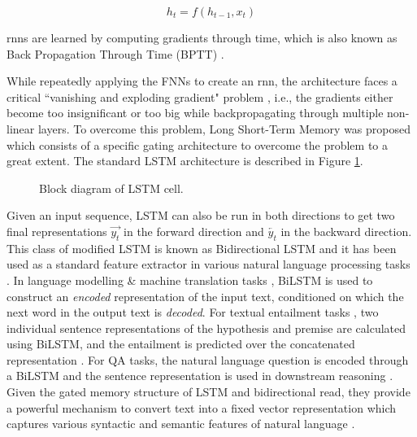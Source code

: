 \documentclass[letterpaper, 12pt]{report}
\begin{document}
\begin{equation}
    h_t = f(h_{t-1}, x_t)
\end{equation}{}

\acrshort{rnn}s are learned by computing gradients through time, which is also known as Back Propagation Through Time (BPTT) \citep{rumelhart1986learning}.

While repeatedly applying the FNNs to create an \acrshort{rnn}, the architecture faces a critical ``vanishing and exploding gradient" problem \citep{hochreiter2001gradient}, i.e., the gradients either become too insignificant or too big while backpropagating through multiple non-linear layers. To overcome this problem, Long Short-Term Memory \citep{hochreiter1997long} was proposed which consists of a specific gating architecture to overcome the problem to a great extent. The standard LSTM architecture is described in Figure \ref{fig:bg_lstm}.

\begin{figure}
  \centering
  \resizebox{10cm}{!}{}
  \caption{Block diagram of LSTM cell.}
  \label{fig:bg_lstm}
\end{figure}

Given an input sequence, LSTM can also be run in both directions to get two final representations $\overrightarrow{y_t}$ in the forward direction and $\overleftarrow{y_t}$ in the backward direction. This class of modified LSTM is known as Bidirectional LSTM and it has been used as a standard feature extractor in various natural language processing tasks \cite{Rocktaschel2015-rr, wang2016machine, serban2016building}. In language modelling \& machine translation tasks \citep{serban2016building, serban2017hierarchical, bahdanau2014neural}, BiLSTM is used to construct an \textit{encoded} representation of the input text, conditioned on which the next word in the output text is \textit{decoded}. For textual entailment tasks \citep{bowman2015large}, two individual sentence representations of the hypothesis and premise are calculated using BiLSTM, and the entailment is predicted over the concatenated representation \citep{Rocktaschel2015-rr}. For QA tasks, the natural language question is encoded through a BiLSTM and the sentence representation is used in downstream reasoning \citep{wang2016machine}. Given the gated memory structure of LSTM and bidirectional read, they provide a powerful mechanism to convert text into a fixed vector representation which captures various syntactic and semantic features of natural language \citep{conneau2018cram}.
\end{document}
